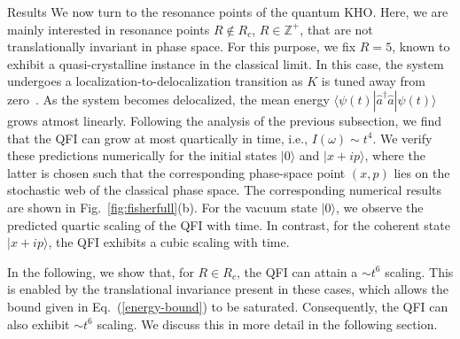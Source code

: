 \documentclass[amsmath,nobibnotes,aps,amssymb,pra, prl,aps,showpacs,superscriptaddress,twocolumn, longbibliography, reprint]{revtex4-2}
\begin{document}
\begin{section}{Results}
We now turn to the resonance points of the quantum KHO. 
Here, we are mainly interested in resonance points $R\notin R_c$, $R\in\mathbb{Z}^+$, that are not translationally invariant in phase space. For this purpose, we fix $R=5$, known to exhibit a quasi-crystalline instance in the classical limit. In this case, the system undergoes a localization-to-delocalization transition as $K$ is tuned away from zero~\cite{shepelyansky1992quantum}. %
As the system becomes delocalized, the mean energy $\langle\psi(t)| \hat{a}^\dagger \hat{a}|\psi(t)\rangle$ grows atmost linearly. 
Following the analysis of the previous subsection, we find that the QFI can grow at most quartically in time, i.e., $I(\omega)\sim t^4$. We verify these predictions numerically for the initial states $|0\rangle$ and $|x+ip\rangle$, where the latter is chosen such that the corresponding phase-space point $(x,p)$ lies on the stochastic web of the classical phase space. The corresponding numerical results are shown in Fig.~\ref{fig:fisherfull}(b). For the vacuum state $|0\rangle$, we observe the predicted quartic scaling of the QFI with time. In contrast, for the coherent state $|x+ip\rangle$, the QFI exhibits a cubic scaling with time. 



In the following, we show that, for $R\in R_c$, the QFI can attain a $\sim t^6$ scaling. This is enabled by the translational invariance present in these cases, which allows the bound given in Eq.~(\ref{energy-bound}) to be saturated. Consequently, the QFI can also exhibit $\sim t^6$ scaling. We discuss this in more detail in the following section. 
 


\end{section}
\end{document}
